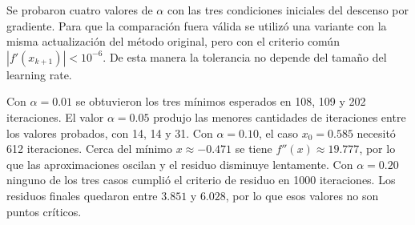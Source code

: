 \documentclass[12pt]{article}
\begin{document}
Se probaron cuatro valores de $\alpha$ con las tres condiciones iniciales del descenso por gradiente. Para que la comparación fuera válida se utilizó una variante con la misma actualización del método original, pero con el criterio común $|f'(x_{k+1})|<10^{-6}$. De esta manera la tolerancia no depende del tamaño del learning rate.

\begin{table}[h]
\centering
{}
\caption{Comparación de learning rates para descenso por gradiente.}
\label{tab:learning-rates}
\end{table}

Con $\alpha=0.01$ se obtuvieron los tres mínimos esperados en 108, 109 y 202 iteraciones. El valor $\alpha=0.05$ produjo las menores cantidades de iteraciones entre los valores probados, con 14, 14 y 31. Con $\alpha=0.10$, el caso $x_0=0.585$ necesitó 612 iteraciones. Cerca del mínimo $x\approx-0.471$ se tiene $f''(x)\approx19.777$, por lo que las aproximaciones oscilan y el residuo disminuye lentamente. Con $\alpha=0.20$ ninguno de los tres casos cumplió el criterio de residuo en 1000 iteraciones. Los residuos finales quedaron entre $3.851$ y $6.028$, por lo que esos valores no son puntos críticos.
\end{document}

